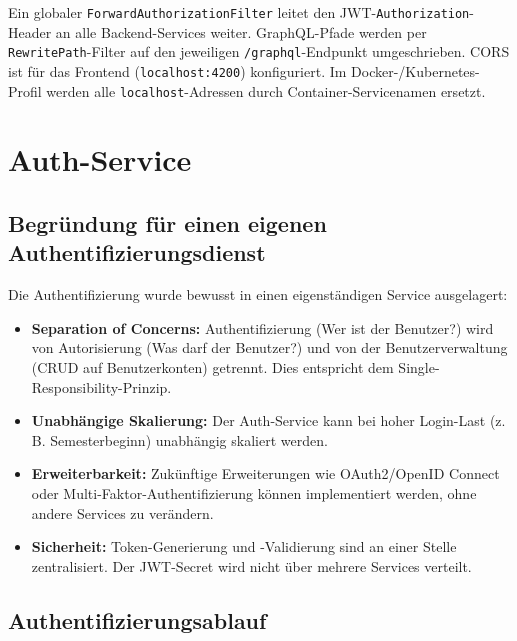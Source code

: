 \documentclass[12pt,a4paper,ngerman]{article}
\begin{document}
Ein globaler \texttt{ForwardAuthorizationFilter} leitet den JWT-\texttt{Authorization}-Header an alle Backend-Services weiter. GraphQL-Pfade werden per \texttt{RewritePath}-Filter auf den jeweiligen \texttt{/graphql}-Endpunkt umgeschrieben. CORS ist für das Frontend (\texttt{localhost:4200}) konfiguriert. Im Docker-/Kubernetes-Profil werden alle \texttt{localhost}-Adressen durch Container-Servicenamen ersetzt.

\section{Auth-Service}

\subsection{Begründung für einen eigenen Authentifizierungsdienst}

Die Authentifizierung wurde bewusst in einen eigenständigen Service ausgelagert:

\begin{itemize}[nosep]
\item \textbf{Separation of Concerns:} Authentifizierung (Wer ist der Benutzer?) wird von Autorisierung (Was darf der Benutzer?) und von der Benutzerverwaltung (CRUD auf Benutzerkonten) getrennt. Dies entspricht dem Single-Responsibility-Prinzip.
\item \textbf{Unabhängige Skalierung:} Der Auth-Service kann bei hoher Login-Last (z.\,B. Semesterbeginn) unabhängig skaliert werden.
\item \textbf{Erweiterbarkeit:} Zukünftige Erweiterungen wie OAuth2/OpenID Connect oder Multi-Faktor-Authentifizierung können implementiert werden, ohne andere Services zu verändern.
\item \textbf{Sicherheit:} Token-Generierung und -Validierung sind an einer Stelle zentralisiert. Der JWT-Secret wird nicht über mehrere Services verteilt.
\end{itemize}

\subsection{Authentifizierungsablauf}
\end{document}
